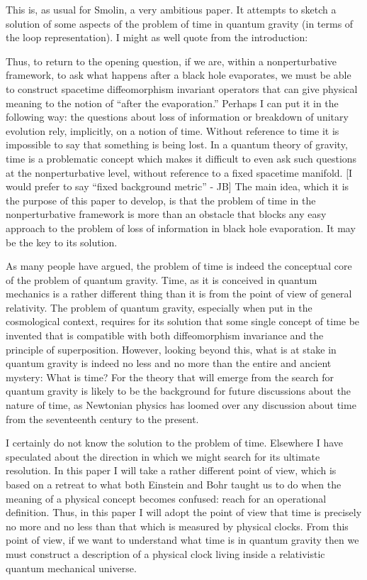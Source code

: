 
This is, as usual for Smolin, a very ambitious paper. It attempts to sketch a solution of some aspects of the problem of time in quantum gravity (in terms of the loop representation). I might as well quote from the introduction:

Thus, to return to the opening question, if we are, within a nonperturbative framework, to ask what happens after a black hole evaporates, we must be able to construct spacetime diffeomorphism invariant operators that can give physical meaning to the notion of ``after the evaporation.'' Perhaps I can put it in the following way: the questions about loss of information or breakdown of unitary evolution rely, implicitly, on a notion of time. Without reference to time it is impossible to say that something is being lost. In a quantum theory of gravity, time is a problematic concept which makes it difficult to even ask such questions at the nonperturbative level, without reference to a fixed spacetime manifold. [I would prefer to say ``fixed background metric'' - JB] The main idea, which it is the purpose of this paper to develop, is that the problem of time in the nonperturbative framework is more than an obstacle that blocks any easy approach to the problem of loss of information in black hole evaporation. It may be the key to its solution.

As many people have argued, the problem of time is indeed the conceptual core of the problem of quantum gravity. Time, as it is conceived in quantum mechanics is a rather different thing than it is from the point of view of general relativity. The problem of quantum gravity, especially when put in the cosmological context, requires for its solution that some single concept of time be invented that is compatible with both diffeomorphism invariance and the principle of superposition. However, looking beyond this, what is at stake in quantum gravity is indeed no less and no more than the entire and ancient mystery: What is time? For the theory that will emerge from the search for quantum gravity is likely to be the background for future discussions about the nature of time, as Newtonian physics has loomed over any discussion about time from the seventeenth century to the present.

I certainly do not know the solution to the problem of time. Elsewhere I have speculated about the direction in which we might search for its ultimate resolution. In this paper I will take a rather different point of view, which is based on a retreat to what both Einstein and Bohr taught us to do when the meaning of a physical concept becomes confused: reach for an operational definition. Thus, in this paper I will adopt the point of view that time is precisely no more and no less than that which is measured by physical clocks. From this point of view, if we want to understand what time is in quantum gravity then we must construct a description of a physical clock living inside a relativistic quantum mechanical universe.

